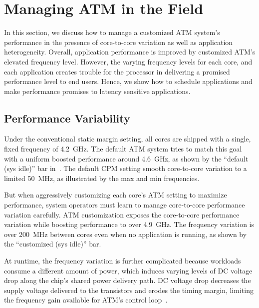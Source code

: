 \section{Managing ATM in the Field}
\label{sec:process:schedule}


In this section, we discuss how to manage a customized ATM system's performance in the presence of core-to-core variation as well as application heterogeneity. Overall, application performance is improved by customized ATM's elevated frequency level. However, the varying frequency levels for each core, and each application creates trouble for the processor in delivering a promised performance level to end users. Hence, we show how to schedule applications and make performance promises to latency sensitive applications.



\subsection{Performance Variability}

Under the conventional static margin setting, all cores are shipped with a single, fixed frequency of 4.2~GHz. The default ATM system tries to match this goal with a uniform boosted performance around 4.6~GHz, as shown by the ``default (sys idle)'' bar in~. The default CPM setting smooth core-to-core variation to a limited 50~MHz, as illustrated by the max and min frequencies. 

But when aggressively customizing each core's ATM setting to maximize performance, system operators must learn to manage core-to-core performance variation carefully. ATM customization exposes the core-to-core performance variation while boosting performance to over 4.9~GHz. The frequency variation is over 200~MHz between cores even when no application is running, as shown by the ``customized (sys idle)'' bar. 

At runtime, the frequency variation is further complicated because workloads consume a different amount of power, which induces varying levels of DC voltage drop along the chip's shared power delivery path. DC voltage drop decreases the supply voltage delivered to the transistors and erodes the timing margin, limiting the frequency gain available for ATM's control loop~\cite{zu2015adaptive}. 

